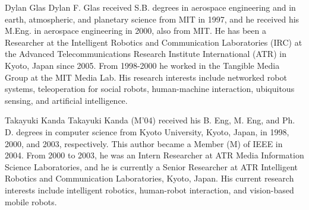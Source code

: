 \documentclass[journal]{IEEEtran}
\begin{document}
\begin{IEEEbiography}{Dylan Glas}
Dylan F. Glas received S.B. degrees in aerospace engineering and in earth, atmospheric, and planetary science from MIT in 1997, and he received his M.Eng. in aerospace engineering in 2000, also from MIT.
He has been a Researcher at the Intelligent Robotics and Communication Laboratories (IRC) at the Advanced Telecommunications Research Institute International (ATR) in Kyoto, Japan since 2005. From 1998-2000 he worked in the Tangible Media Group at the MIT Media Lab.  His research interests include networked robot systems, teleoperation for social robots, human-machine interaction, ubiquitous sensing, and artificial intelligence.
\end{IEEEbiography}

\begin{IEEEbiography}{Takayuki Kanda}
Takayuki Kanda (M’04) received his B. Eng, M. Eng, and Ph. D. degrees in computer science from Kyoto University, Kyoto, Japan, in 1998, 2000, and 2003, respectively. This author became a Member (M) of IEEE in 2004. From 2000 to 2003, he was an Intern Researcher at ATR Media Information Science Laboratories, and he is currently a Senior Researcher at ATR Intelligent Robotics and Communication Laboratories, Kyoto, Japan. His current research interests include intelligent robotics, human-robot interaction, and vision-based mobile robots.
\end{IEEEbiography}
\end{document}
